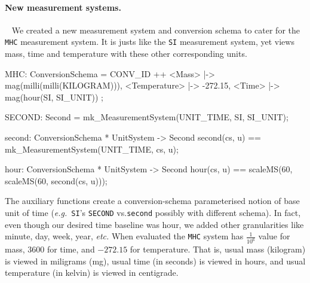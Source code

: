 \documentclass[runningheads,a4paper]{llncs}
\begin{document}
\paragraph*{New measurement systems.}~
%
We created a new measurement system and conversion schema to cater for the  \texttt{MHC} measurement system. It is justs like the \texttt{SI} measurement system, yet views mass, time and temperature with these other corresponding units.
%
\begin{vdmsl}[frame=none,basicstyle=\ttfamily\scriptsize]
    MHC: ConversionSchema = CONV_ID ++ 
        { <Mass> |-> mag(milli(milli(KILOGRAM))), <Temperature> |-> -272.15,
          <Time> |-> mag(hour(SI, SI_UNIT)) };

    SECOND: Second = mk_MeasurementSystem(UNIT_TIME, SI, SI_UNIT);

    second: ConversionSchema * UnitSystem -> Second
    second(cs, u) == mk_MeasurementSystem(UNIT_TIME, cs, u);
    
    hour: ConversionSchema * UnitSystem -> Second 
    hour(cs, u) == scaleMS(60, scaleMS(60, second(cs, u)));      
\end{vdmsl}
%
\noindent The auxiliary functions create a conversion-schema parameterised notion of base unit of time (\textit{e.g.}~\texttt{SI}'s \texttt{SECOND} vs.\@ \texttt{second} possibly with different schema). In fact, even though our desired time baseline was hour, we added other granularities like minute, day, week, year, \textit{etc.} When evaluated the \texttt{MHC} system has \(\frac{1}{10^6}\) value for mass, \(3600\) for time, and \(-272.15\) for temperature. That is, usual mass (kilogram) is viewed in miligrams (mg), usual time (in seconds) is viewed in hours, and usual temperature (in kelvin) is viewed in centigrade.
\end{document}
